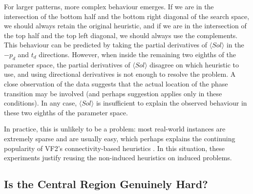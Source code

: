 \documentclass[twoside,11pt]{article}
\newcommand{\citep}[1]{\cite{#1}}
\begin{document}
For larger patterns, more complex behaviour emerges. If we are in the intersection of the bottom half
and the bottom right diagonal of the search space, we should always retain the original heuristic,
and if we are in the intersection of the top half and the top left diagonal, we should always use
the complements. This behaviour can be predicted by taking the partial derivatives of $\langle Sol
\rangle$ in the $-p_d$ and $t_d$ directions.  However, when inside the remaining two eighths of the
parameter space, the partial derivatives of $\langle Sol \rangle$ disagree on which heuristic to
use, and using directional derivatives is not enough to resolve the problem. A close observation of
the data suggests that the actual location of the phase transition may be involved (and perhaps
 suggestion applies only in these conditions). In any case, $\langle Sol
\rangle$ is insufficient to explain the observed behaviour in these two eighths of the parameter space.

In practice, this is unlikely to be a problem: most real-world instances are extremely sparse and
are usually easy, which perhaps explains the continuing popularity of VF2's connectivity-based
heuristics \citep{Carletti:2015}. In this situation, these experiments justify reusing the
non-induced heuristics on induced problems.

\subsection{Is the Central Region Genuinely Hard?}
\end{document}
